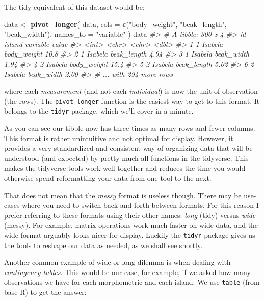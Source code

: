 \documentclass[]{book}
\newenvironment{Shaded}{}{}
\newcommand{\CommentTok}[1]{\textcolor[rgb]{0.38,0.63,0.69}{\textit{#1}}}
\newcommand{\DataTypeTok}[1]{\textcolor[rgb]{0.56,0.13,0.00}{#1}}
\newcommand{\KeywordTok}[1]{\textcolor[rgb]{0.00,0.44,0.13}{\textbf{#1}}}
\newcommand{\NormalTok}[1]{#1}
\newcommand{\StringTok}[1]{\textcolor[rgb]{0.25,0.44,0.63}{#1}}
\begin{document}
The tidy equivalent of this dataset would be:

\begin{Shaded}
\begin{Highlighting}[]
\NormalTok{data <-}\StringTok{ }\KeywordTok{pivot_longer}\NormalTok{(}
\NormalTok{  data, }
  \DataTypeTok{cols =} \KeywordTok{c}\NormalTok{(}\StringTok{"body_weight"}\NormalTok{, }\StringTok{"beak_length"}\NormalTok{, }\StringTok{"beak_width"}\NormalTok{),}
  \DataTypeTok{names_to =} \StringTok{"variable"}
\NormalTok{)}
\NormalTok{data}
\CommentTok{#> # A tibble: 300 x 4}
\CommentTok{#>      id island  variable    value}
\CommentTok{#>   <int> <chr>   <chr>       <dbl>}
\CommentTok{#> 1     1 Isabela body_weight 10.8 }
\CommentTok{#> 2     1 Isabela beak_length  4.94}
\CommentTok{#> 3     1 Isabela beak_width   1.94}
\CommentTok{#> 4     2 Isabela body_weight 15.4 }
\CommentTok{#> 5     2 Isabela beak_length  5.02}
\CommentTok{#> 6     2 Isabela beak_width   2.00}
\CommentTok{#> # ... with 294 more rows}
\end{Highlighting}
\end{Shaded}

where each \emph{measurement} (and not each \emph{individual}) is now the unit of observation (the rows). The \texttt{pivot\_longer} function is the easiest way to get to this format. It belongs to the \texttt{tidyr} package, which we'll cover in a minute.

As you can see our tibble now has three times as many rows and fewer columns. This format is rather unintuitive and not optimal for display. However, it provides a very standardized and consistent way of organizing data that will be understood (and expected) by pretty much all functions in the tidyverse. This makes the tidyverse tools work well together and reduces the time you would otherwise spend reformatting your data from one tool to the next.

That does not mean that the \emph{messy} format is useless though. There may be use-cases where you need to switch back and forth between formats. For this reason I prefer referring to these formats using their other names: \emph{long} (tidy) versus \emph{wide} (messy). For example, matrix operations work much faster on wide data, and the wide format arguably looks nicer for display. Luckily the \texttt{tidyr} package gives us the tools to reshape our data as needed, as we shall see shortly.

Another common example of wide-or-long dilemma is when dealing with \emph{contingency tables}. This would be our case, for example, if we asked how many observations we have for each morphometric and each island. We use \texttt{table} (from base R) to get the answer:
\end{document}

